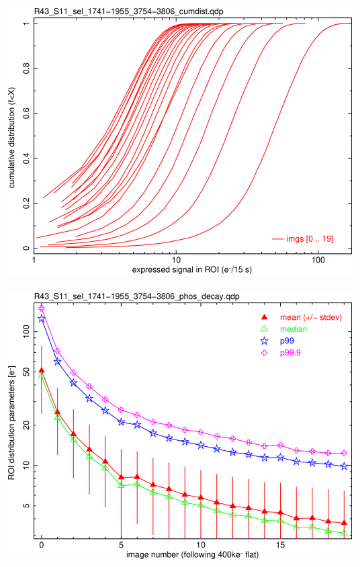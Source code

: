 \begin{figure}[!htbp]
\begin{subfigure}{0.45\textwidth}    
  \centering
  \includegraphics[width=\textwidth]{figures/phosphorescence-survey/phos_kinetics/R43_S11_sel_1741-1955_3754-3806_cumdist.png}    
\end{subfigure}
\hfil
\begin{subfigure}{0.45\textwidth}
  \centering
  \includegraphics[width=\textwidth]{figures/phosphorescence-survey/phos_kinetics/R43_S11_sel_1741-1955_3754-3806_phos_decay.png}
\end{subfigure}
\newline
\begin{subfigure}{0.45\textwidth}    

\end{subfigure}
\end{figure}
